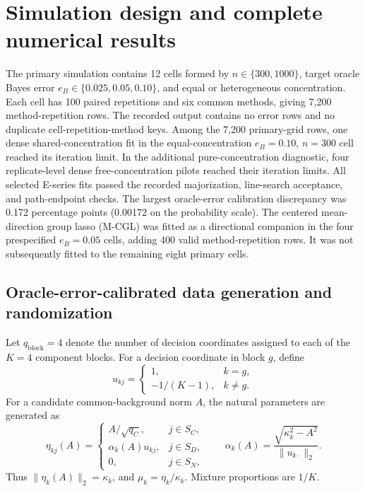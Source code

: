 \documentclass[preprint,12pt,authoryear]{elsarticle}
\begin{document}
\section{Simulation design and complete numerical results}
\label{sec:s-simulation-results}

The primary simulation contains 12 cells formed by
$n\in\{300,1000\}$, target oracle Bayes error
$e_B\in\{0.025,0.05,0.10\}$, and equal or heterogeneous concentration.
Each cell has 100 paired repetitions and six common methods, giving 7,200
method-repetition rows. The recorded output contains no error rows and no
duplicate cell-repetition-method keys. Among the 7,200 primary-grid rows, one
dense shared-concentration fit in the equal-concentration $e_B=0.10$, $n=300$
cell reached its iteration limit. In the additional pure-concentration
diagnostic, four replicate-level dense free-concentration pilots reached their
iteration limits. All selected E-series fits
passed the recorded majorization,
line-search acceptance, and path-endpoint checks. The largest oracle-error
calibration discrepancy was 0.172 percentage points (0.00172 on the probability
scale). The centered mean-direction group lasso (M-CGL) was fitted as a
directional companion in the four prespecified
$e_B=0.05$ cells, adding 400 valid method-repetition rows. It was not
subsequently fitted to the remaining eight primary cells.

\subsection{Oracle-error-calibrated data generation and randomization}

Let $q_{\mathrm{block}}=4$ denote the number of decision coordinates assigned to each of the
$K=4$ component blocks. For a decision coordinate in block $g$, define
\[
u_{kj}=\begin{cases}
1, & k=g,\\
-1/(K-1), & k\ne g.
\end{cases}
\]
For a candidate common-background norm $A$, the natural parameters are
generated as
\[
\eta_{kj}(A)=
\begin{cases}
A/\sqrt{q_C}, & j\in S_C,\\
\alpha_k(A)u_{kj}, & j\in S_D,\\
0, & j\in S_N,
\end{cases}
\qquad
\alpha_k(A)=\frac{\sqrt{\kappa_k^2-A^2}}{\lVert u_{k\cdot}\rVert_2}.
\]
Thus $\lVert\eta_k(A)\rVert_2=\kappa_k$, and
$\mu_k=\eta_k/\kappa_k$. Mixture proportions are $1/K$.
\end{document}
